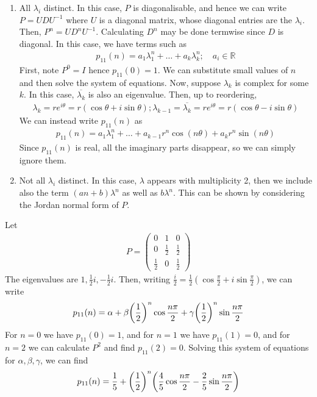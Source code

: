 \begin{enumerate}
	\item All $\lambda_i$ distinct.
	      In this case, $P$ is diagonalisable, and hence we can write $P = U D U^{-1}$ where $U$ is a diagonal matrix, whose diagonal entries are the $\lambda_i$.
	      Then, $P^n = U D^n U^{-1}$.
	      Calculating $D^n$ may be done termwise since $D$ is diagonal.
	      In this case, we have terms such as
	      \begin{align*}
		      p_{11}(n) = a_1 \lambda_1^n + \dots + a_k \lambda_k^n; \quad a_i \in \mathbb R
	      \end{align*}
	      First, note $P^0 = I$ hence $p_{11}(0) = 1$.
	      We can substitute small values of $n$ and then solve the system of equations.
	      Now, suppose $\lambda_k$ is complex for some $k$.
	      In this case, $\overline{\lambda_k}$ is also an eigenvalue.
	      Then, up to reordering,
	      \begin{align*}
		      \lambda_k = re^{i\theta} = r(\cos \theta + i \sin \theta); \lambda_{k-1} = \overline{\lambda_k} = re^{i\theta} = r(\cos \theta - i \sin \theta)
	      \end{align*}
	      We can instead write $p_{11}(n)$ as
	      \begin{align*}
		      p_{11}(n) = a_1 \lambda_1^n + \dots + a_{k-1} r^n \cos (n\theta) + a_k r^n \sin (n\theta)
	      \end{align*}
	      Since $p_{11}(n)$ is real, all the imaginary parts disappear, so we can simply ignore them.
	\item Not all $\lambda_i$ distinct.
	      In this case, $\lambda$ appears with multiplicity 2, then we include also the term $(an + b) \lambda^n$ as well as $b \lambda^n$.
	      This can be shown by considering the Jordan normal form of $P$.
\end{enumerate}
\begin{example}
	Let
	\begin{align*}
		P = \begin{pmatrix}
			0           & 1           & 0           \\
			0           & \frac{1}{2} & \frac{1}{2} \\
			\frac{1}{2} & 0           & \frac{1}{2}
		\end{pmatrix}
	\end{align*}
	The eigenvalues are $1, \frac{1}{2}i, -\frac{1}{2}i$.
	Then, writing $\frac{i}{2} = \frac{1}{2} (\cos \frac{\pi}{2} + i \sin \frac{\pi}{2} )$, we can write
	\begin{align*}
		p_{11}(n) = \alpha + \beta \qty(\frac{1}{2})^n \cos \frac{n \pi}{2} + \gamma \qty(\frac{1}{2})^n \sin \frac{n \pi}{2}
	\end{align*}
	For $n = 0$ we have $p_{11}(0) = 1$, and for $n = 1$ we have $p_{11}(1) = 0$, and for $n = 2$ we can calculate $P^2$ and find $p_{11}(2) = 0$.
	Solving this system of equations for $\alpha, \beta, \gamma$, we can find
	\begin{align*}
		p_{11}(n) = \frac{1}{5} + \qty(\frac{1}{2})^n \qty(\frac{4}{5}\cos \frac{n \pi}{2} - \frac{2}{5}\sin \frac{n \pi}{2} )
	\end{align*}
\end{example}